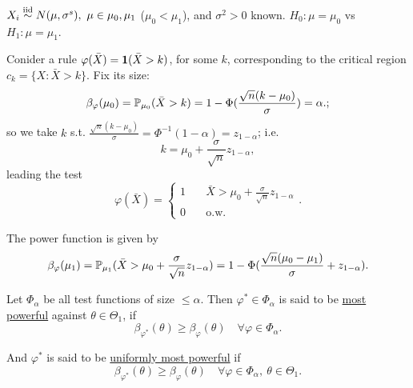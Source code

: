 \begin{exap}
	$X_i \stackrel{\text{iid}}{\sim} N(\mu, \sigma^s),\  \mu \in {\mu_0, \mu_1 }$ ($\mu_0 < \mu_1$), and $\sigma^2 > 0$ known.  $H_0: \mu = \mu_0$ vs $H_1: \mu = \mu_1$.
	
	Conider a rule $\varphi(\bar{X}) = \boldsymbol{1}(\bar{X} > k)$, for some $k$, corresponding to the critical region $c_k = \{X: \bar{X}>k \}$. Fix its size:
	$$\beta_\varphi(\mu_0) = \mathbb{P}_{\mu_0}(\bar{X}> k) = 1 - \Phi( \frac{\sqrt{n}(k- \mu_0)}{\sigma} ) = \alpha.;$$
	so we take $k$ s.t. $\frac{\sqrt{n}(k- \mu_0)}{\sigma} = \Phi^{-1}(1-\alpha)=z_{1-\alpha}$; i.e.
	$$k = \mu_0 + \frac{\sigma}{\sqrt{n}} z_{1 - \alpha},$$
	leading the test
	$$\varphi(\bar{X}) = \begin{cases}
	1 &\quad \bar{X} > \mu_0 + \frac{\sigma}{\sqrt{n}} z_{1 - \alpha} \\
	0 &\quad \text{o.w.}
	\end{cases}.$$
	
	The power function is given by
	$$\beta_\varphi(\mu_1) = \mathbb{P}_{\mu_1}( \bar{X} > \mu_0 + \frac{\sigma}{\sqrt{n}} z_{1 - \alpha} ) = 1 - \Phi( \frac{\sqrt{n}(\mu_0 - \mu_1)}{\sigma} + z_{1-\alpha} ).$$
\end{exap}

\begin{mydef}
	Let $\Phi_\alpha$ be all test functions of size $\leq \alpha$. Then $\varphi^\ast \in \Phi_\alpha$ is said to be \uline{most powerful} against $\theta \in \Theta_1$, if
	$$\beta_{\varphi^\ast} (\theta) \geq \beta_{\varphi} (\theta) \quad \forall \varphi \in \Phi_\alpha.$$
	
	And $\varphi^\ast$ is said to be \underline{uniformly most powerful} if  
	$$\beta_{\varphi^\ast} (\theta) \geq \beta_{\varphi} (\theta) \quad \forall \varphi \in \Phi_\alpha,\ \theta \in \Theta_1.$$
\end{mydef}



